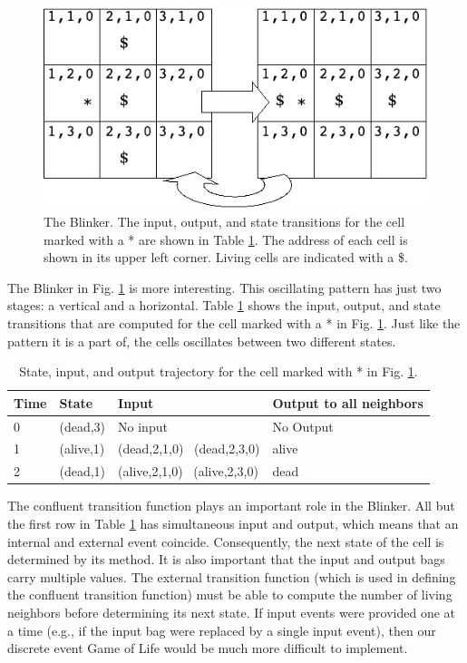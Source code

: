 \begin{figure}[ht]
\centering
\includegraphics{network_models_figs/blinker.pdf}
\caption{The Blinker. The input, output, and state transitions for the cell marked with a * are shown in Table \ref{tab:blinker_cell_activity}. The address of each cell is shown in its upper left corner. Living cells are indicated with a \$.}
\label{fig:gol_blinker}
\end{figure}
The Blinker in Fig. \ref{fig:gol_blinker} is more interesting. This oscillating pattern has just two stages: a vertical and a horizontal. Table \ref{tab:blinker_cell_activity} shows the input, output, and state transitions that are computed for the cell marked with a * in Fig. \ref{fig:gol_blinker}. Just like the pattern it is a part of, the cells oscillates between two different states.
\begin{table}[ht]
\centering
\begin{tabular}{|l|l|l|l|}
\hline Time & State      & Input & Output to all neighbors\\ \hline
0 & (dead,3) & No input & No Output \\ \hline 
1 & (alive,1) & (dead,2,1,0) \ (dead,2,3,0) & alive \\ \hline 
2 & (dead,1) & (alive,2,1,0) \ (alive,2,3,0) & dead \\ \hline
\end{tabular}
\caption{State, input, and output trajectory for the cell marked with * in Fig. \ref{fig:gol_blinker}.}
\label{tab:blinker_cell_activity}
\end{table}

The confluent transition function plays an important role in the Blinker. All but the first row in Table \ref{tab:blinker_cell_activity} has simultaneous input and output, which means that an internal and external event coincide. Consequently, the next state of the cell is determined by its  method. It is also important that the input and output bags carry multiple values. The external transition function (which is used in defining the confluent transition function) must be able to compute the number of living neighbors before determining its next state. If input events were provided one at a time (e.g., if the input bag were replaced by a single input event), then our discrete event Game of Life would be much more difficult to implement.
